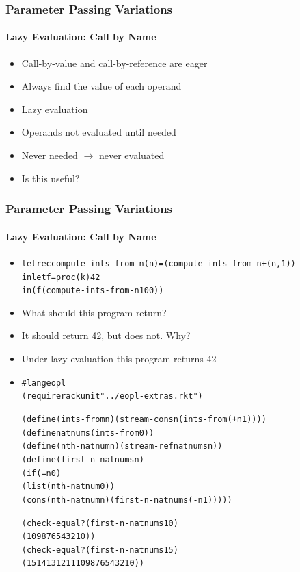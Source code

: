 \documentclass{beamer}
\newcommand{\arrow}{\(\rightarrow\)}
\newcommand{\quot}{\texttt{\textquotesingle{}}}
\begin{document}
\begin{frame}[fragile]
\frametitle{Parameter Passing Variations}
\framesubtitle{Lazy Evaluation: Call by Name}
\begin{scriptsize}
\begin{itemize}
\item<1-> Call-by-value and call-by-reference are eager

\item<1-> Always find the value of each operand

\item<2-> Lazy evaluation

\item<2-> Operands not evaluated until needed

\item<2-> Never needed \arrow{} never evaluated

\item<3-> Is this useful?


\end{itemize}
\end{scriptsize}
\end{frame}

\begin{frame}[fragile]
\frametitle{Parameter Passing Variations}
\framesubtitle{Lazy Evaluation: Call by Name}
\begin{scriptsize}
\begin{itemize}
\item<1->
\begin{alltt}
letrec compute-ints-from-n (n) = (compute-ints-from-n +(n, 1))
in let f = proc (k) 42
   in (f (compute-ints-from-n 100))
\end{alltt}

\item<1-> What should this program return?

\item<2-> It should return 42, but does not. Why?

\item<3-> Under lazy evaluation this program returns 42

\item<4->
\begin{alltt}
#lang eopl
(require rackunit "../eopl-extras.rkt")

(define (ints-from n) (stream-cons n (ints-from (+ n 1))))
(define natnums (ints-from 0))
(define (nth-natnum n) (stream-ref natnums n))
(define (first-n-natnums n)
  (if (= n 0)
      (list (nth-natnum 0))
      (cons (nth-natnum n) (first-n-natnums (- n 1)))))

(check-equal?  (first-n-natnums 10)
               \quot{}(10 9 8 7 6 5 4 3 2 1 0))
(check-equal?  (first-n-natnums 15)
               \quot{}(15 14 13 12 11 10 9 8 7 6 5 4 3 2 1 0))
\end{alltt}


\end{itemize}
\end{scriptsize}
\end{frame}
\end{document}
